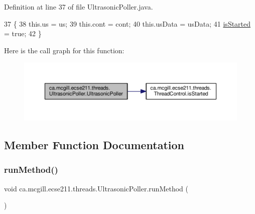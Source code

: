 Definition at line 37 of file Ultrasonic\+Poller.\+java.


\begin{DoxyCode}
37                                                                               \{
38     this.us = us;
39     this.cont = cont;
40     this.usData = usData;
41     \hyperlink{classca_1_1mcgill_1_1ecse211_1_1threads_1_1_thread_control_a92f4933511db42476e39956246bcf2fe}{isStarted} = \textcolor{keyword}{true};
42   \}
\end{DoxyCode}
Here is the call graph for this function\+:\nopagebreak
\begin{figure}[H]
\begin{center}
\leavevmode
\includegraphics[width=350pt]{classca_1_1mcgill_1_1ecse211_1_1threads_1_1_ultrasonic_poller_ac561f5d04e2b655a4509de8453c0cd07_cgraph}
\end{center}
\end{figure}


\subsection{Member Function Documentation}
\mbox{\label{classca_1_1mcgill_1_1ecse211_1_1threads_1_1_ultrasonic_poller_a8e6a84342aedc1b72741dbc2e80148c4}} 
\subsubsection{\texorpdfstring{run\+Method()}{runMethod()}}
{\footnotesize\ttfamily void ca.\+mcgill.\+ecse211.\+threads.\+Ultrasonic\+Poller.\+run\+Method (\begin{DoxyParamCaption}{ }\end{DoxyParamCaption})\hspace{0.3cm}{\ttfamily [protected]}}

